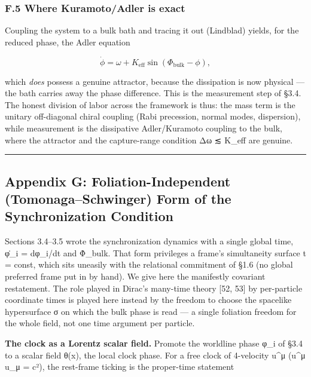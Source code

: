 \documentclass[
]{article}
\begin{document}
\subsubsection{F.5 Where Kuramoto/Adler is
exact}\label{f.5-where-kuramotoadler-is-exact}

Coupling the system to a bulk bath and tracing it out (Lindblad) yields,
for the reduced phase, the Adler equation

\[\dot\phi = \omega + K_{\text{eff}}\sin(\Phi_{\text{bulk}} - \phi),\]

which \emph{does} possess a genuine attractor, because the dissipation
is now physical --- the bath carries away the phase difference. This is
the measurement step of §3.4. The honest division of labor across the
framework is thus: the mass term is the unitary off-diagonal chiral
coupling (Rabi precession, normal modes, dispersion), while measurement
is the dissipative Adler/Kuramoto coupling to the bulk, where the
attractor and the capture-range condition \textbar Δω\textbar{} ≲ K\_eff
are genuine.

\begin{center}\rule{0.5\linewidth}{0.5pt}\end{center}

\subsection{Appendix G: Foliation-Independent (Tomonaga--Schwinger) Form
of the Synchronization
Condition}\label{appendix-g-foliation-independent-tomonagaschwinger-form-of-the-synchronization-condition}

Sections 3.4--3.5 wrote the synchronization dynamics with a single
global time, φ̇\_i = dφ\_i/dt and Φ̇\_bulk. That form privileges a frame's
simultaneity surface t = const, which sits uneasily with the relational
commitment of §1.6 (no global preferred frame put in by hand). We give
here the manifestly covariant restatement. The role played in Dirac's
many-time theory {[}52, 53{]} by per-particle coordinate times is played
here instead by the freedom to choose the spacelike hypersurface σ on
which the bulk phase is read --- a single foliation freedom for the
whole field, not one time argument per particle.

\textbf{The clock as a Lorentz scalar field.} Promote the worldline
phase φ\_i of §3.4 to a scalar field θ(x), the local clock phase. For a
free clock of 4-velocity u\^{}μ (u\^{}μ u\_μ = c²), the rest-frame
ticking is the proper-time statement
\end{document}
